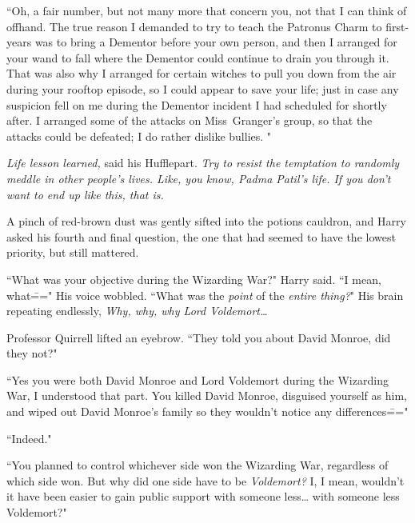 ``Oh, a fair number, but not many more that concern you, not that I can think of offhand. The true reason I demanded to try to teach the Patronus Charm to first-years was to bring a Dementor before your own person, and then I arranged for your wand to fall where the Dementor could continue to drain you through it.  That was also why I arranged for certain witches to pull you down from the air during your rooftop episode, so I could appear to save your life; just in case any suspicion fell on me during the Dementor incident I had scheduled for shortly after.  I arranged some of the attacks on Miss~Granger's group, so that the attacks could be defeated; I do rather dislike bullies. "

\emph{Life lesson learned,} said his Hufflepart. \emph{Try to resist the temptation to randomly meddle in other people's lives. Like, you know, Padma Patil's life. If you don't want to end up like this, that is.}

A pinch of red-brown dust was gently sifted into the potions cauldron, and Harry asked his fourth and final question, the one that had seemed to have the lowest priority, but still mattered.

``What was your objective during the Wizarding War?" Harry said. ``I mean, what\===" His voice wobbled. ``What was the \emph{point} of the \emph{entire thing?}" His brain repeating endlessly, \emph{Why, why, why Lord Voldemort{\ldots}}

Professor Quirrell lifted an eyebrow. ``They told you about David Monroe, did they not?"

``Yes you were both David Monroe and Lord Voldemort during the Wizarding War, I understood that part. You killed David Monroe, disguised yourself as him, and wiped out David Monroe's family so they wouldn't notice any differences\==="

``Indeed."

``You planned to control whichever side won the Wizarding War, regardless of which side won. But why did one side have to be \emph{Voldemort?} I, I mean, wouldn't it have been easier to gain public support with someone less{\ldots} with someone less Voldemort?"

